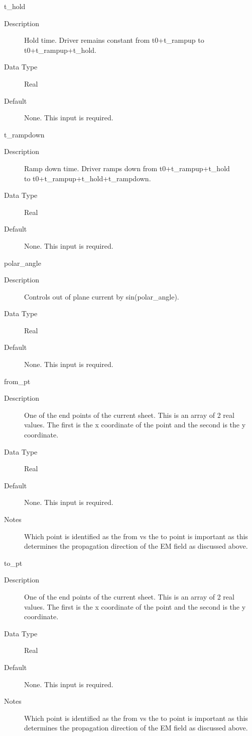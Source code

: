 \documentclass[11pt]{amsart}
\begin{document}
t\_hold
\begin{description}
\item [Description] Hold time.  Driver remains constant from t0+t\_rampup to \\
t0+t\_rampup+t\_hold.
\item [Data Type] Real
\item [Default] None.  This input is required.
\end{description}

t\_rampdown
\begin{description}
\item [Description] Ramp down time.  Driver ramps down from t0+t\_rampup+t\_hold \\
to t0+t\_rampup+t\_hold+t\_rampdown.
\item [Data Type] Real
\item [Default] None.  This input is required.
\end{description}

polar\_angle
\begin{description}
\item [Description] Controls out of plane current by sin(polar\_angle).
\item [Data Type] Real
\item [Default] None.  This input is required.
\end{description}

from\_pt
\begin{description}
\item [Description] One of the end points of the current sheet.  This is an
array of 2 real values.  The first is the x coordinate of the point and the
second is the y coordinate.
\item [Data Type] Real
\item [Default] None.  This input is required.
\item [Notes] Which point is identified as the from vs the to point is important
as this determines the propagation direction of the EM field as discussed above.
\end{description}

to\_pt
\begin{description}
\item [Description] One of the end points of the current sheet.  This is an
array of 2 real values.  The first is the x coordinate of the point and the
second is the y coordinate.
\item [Data Type] Real
\item [Default] None.  This input is required.
\item [Notes] Which point is identified as the from vs the to point is important
as this determines the propagation direction of the EM field as discussed above.
\end{description}
\end{document}
